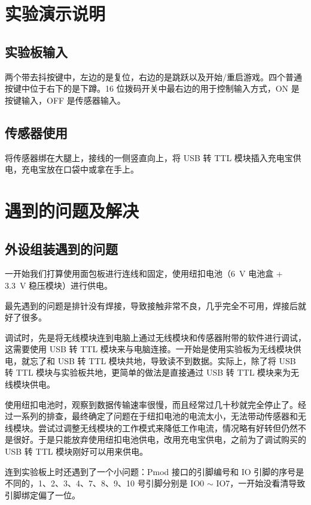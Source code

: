 \documentclass[UTF8, 11pt, fontset=none]{ctexart}
\begin{document}
\section{实验演示说明}

\subsection{实验板输入}

两个带去抖按键中，左边的是复位，右边的是跳跃以及开始/重启游戏。四个普通按键中位于右下的是下蹲。16 位拨码开关中最右边的用于控制输入方式，ON 是按键输入，OFF 是传感器输入。

\subsection{传感器使用}

将传感器绑在大腿上，接线的一侧竖直向上，将 USB 转 TTL 模块插入充电宝供电，充电宝放在口袋中或拿在手上。

\section{遇到的问题及解决}

\subsection{外设组装遇到的问题}

一开始我们打算使用面包板进行连线和固定，使用纽扣电池（\SI{6}{\volt} 电池盒 + \SI{3.3}{\volt} 稳压模块）进行供电。

最先遇到的问题是排针没有焊接，导致接触非常不良，几乎完全不可用，焊接后就好了很多。

调试时，先是将无线模块连到电脑上通过无线模块和传感器附带的软件进行调试，这需要使用 USB 转 TTL 模块来与电脑连接。一开始是使用实验板为无线模块供电，就忘了和 USB 转 TTL 模块共地，导致读不到数据。实际上，除了将 USB 转 TTL 模块与实验板共地，更简单的做法是直接通过 USB 转 TTL 模块来为无线模块供电。

使用纽扣电池时，观察到数据传输速率很慢，而且经常过几十秒就完全停止了。经过一系列的排查，最终确定了问题在于纽扣电池的电流太小，无法带动传感器和无线模块。尝试过调整无线模块的工作模式来降低工作电流，情况略有好转但仍然不是很好。于是只能放弃使用纽扣电池供电，改用充电宝供电，之前为了调试购买的 USB 转 TTL 模块刚好可以用来供电。

连到实验板上时还遇到了一个小问题：Pmod 接口的引脚编号和 IO 引脚的序号是不同的，1、2、3、4、7、8、9、10 号引脚分别是 IO0 $\sim$ IO7，一开始没看清导致引脚绑定偏了一位。
\end{document}
